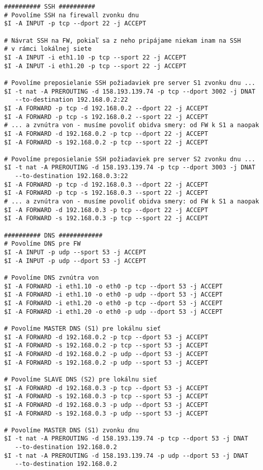 {\begin{small}
\begin{verbatim}
########## SSH ##########
# Povolíme SSH na firewall zvonku dnu
$I -A INPUT -p tcp --dport 22 -j ACCEPT

# Návrat SSH na FW, pokiaľ sa z neho pripájame niekam inam na SSH
# v rámci lokálnej siete
$I -A INPUT -i eth1.10 -p tcp --sport 22 -j ACCEPT
$I -A INPUT -i eth1.20 -p tcp --sport 22 -j ACCEPT

# Povolíme preposielanie SSH požiadaviek pre server S1 zvonku dnu ...
$I -t nat -A PREROUTING -d 158.193.139.74 -p tcp --dport 3002 -j DNAT
   --to-destination 192.168.0.2:22
$I -A FORWARD -p tcp -d 192.168.0.2 --dport 22 -j ACCEPT
$I -A FORWARD -p tcp -s 192.168.0.2 --sport 22 -j ACCEPT
# ... a zvnútra von - musíme povoliť obidva smery: od FW k S1 a naopak
$I -A FORWARD -d 192.168.0.2 -p tcp --dport 22 -j ACCEPT
$I -A FORWARD -s 192.168.0.2 -p tcp --sport 22 -j ACCEPT

# Povolíme preposielanie SSH požiadaviek pre server S2 zvonku dnu ...
$I -t nat -A PREROUTING -d 158.193.139.74 -p tcp --dport 3003 -j DNAT
   --to-destination 192.168.0.3:22
$I -A FORWARD -p tcp -d 192.168.0.3 --dport 22 -j ACCEPT
$I -A FORWARD -p tcp -s 192.168.0.3 --sport 22 -j ACCEPT
# ... a zvnútra von - musíme povoliť obidva smery: od FW k S1 a naopak
$I -A FORWARD -d 192.168.0.3 -p tcp --dport 22 -j ACCEPT
$I -A FORWARD -s 192.168.0.3 -p tcp --sport 22 -j ACCEPT

########## DNS ############
# Povolíme DNS pre FW
$I -A INPUT -p udp --sport 53 -j ACCEPT
$I -A INPUT -p udp --dport 53 -j ACCEPT

# Povolíme DNS zvnútra von
$I -A FORWARD -i eth1.10 -o eth0 -p tcp --dport 53 -j ACCEPT
$I -A FORWARD -i eth1.10 -o eth0 -p udp --dport 53 -j ACCEPT
$I -A FORWARD -i eth1.20 -o eth0 -p tcp --dport 53 -j ACCEPT
$I -A FORWARD -i eth1.20 -o eth0 -p udp --dport 53 -j ACCEPT

# Povolíme MASTER DNS (S1) pre lokálnu sieť
$I -A FORWARD -d 192.168.0.2 -p tcp --dport 53 -j ACCEPT
$I -A FORWARD -s 192.168.0.2 -p tcp --sport 53 -j ACCEPT
$I -A FORWARD -d 192.168.0.2 -p udp --dport 53 -j ACCEPT
$I -A FORWARD -s 192.168.0.2 -p udp --sport 53 -j ACCEPT

# Povolíme SLAVE DNS (S2) pre lokálnu sieť
$I -A FORWARD -d 192.168.0.3 -p tcp --dport 53 -j ACCEPT
$I -A FORWARD -s 192.168.0.3 -p tcp --sport 53 -j ACCEPT
$I -A FORWARD -d 192.168.0.3 -p udp --dport 53 -j ACCEPT
$I -A FORWARD -s 192.168.0.3 -p udp --sport 53 -j ACCEPT

# Povolíme MASTER DNS (S1) zvonku dnu
$I -t nat -A PREROUTING -d 158.193.139.74 -p tcp --dport 53 -j DNAT
   --to-destination 192.168.0.2
$I -t nat -A PREROUTING -d 158.193.139.74 -p udp --dport 53 -j DNAT
   --to-destination 192.168.0.2


\end{verbatim}
\end{small}}
